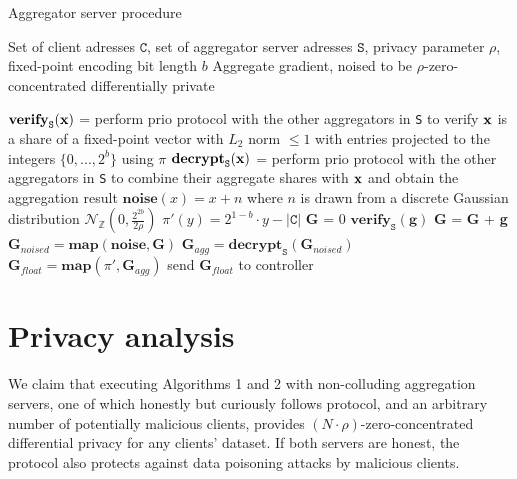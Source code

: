 \documentclass{article}
\begin{document}
\begin{algorithm}[h]
  \caption{Aggregator server procedure}\label{alg:server}
  \begin{algorithmic}[1]
  \Require Set of client adresses $\texttt{C}$, set of aggregator server adresses $\texttt{S}$, privacy parameter $\rho$, fixed-point encoding bit length $b$
  \Ensure Aggregate gradient, noised to be $\rho$-zero-concentrated differentially private

  \State$\textbf{verify}_{\texttt{S}}(\textbf x)$ = perform prio protocol with the other aggregators in \texttt{S} to verify $\textbf x$ is a share of a fixed-point vector with $L_2$ norm $\leq 1$ with entries projected to the integers $\{0,...,2^b\}$ using $\pi$
  \State$\textbf{decrypt}_{\texttt{S}}(\textbf x)$ = perform prio protocol with the other aggregators in \texttt{S} to combine their aggregate shares with $\textbf x$ and obtain the aggregation result
  \State$\textbf{noise}(x) = x+n$ where $n$ is drawn from a discrete Gaussian distribution $\mathcal N_\mathbb{Z}\left(0,\frac{2^{2b}}{2\rho}\right)$
  \State$\pi'(y) = 2^{1-b} \cdot y - |\texttt{C}|$ 
  \State\textbf{G} = 0
	   \State$\textbf{verify}_\texttt{S}(\textbf{g})$ \label{lst:line:verify}
	   \State\textbf{G} = \textbf{G} + \textbf{g}
  \EndFor
  \State$\textbf{G}_{noised} = \textbf{map}(\textbf{noise}, \textbf{G})$   \label{lst:line:noise}
  \State$\textbf{G}_{agg} = \textbf{decrypt}_{\texttt{S}}(\textbf{G}_{noised})$ 
  \State$\textbf{G}_{float} = \textbf{map}(\pi', \textbf{G}_{agg})$ 
  \State send $\textbf{G}_{float}$ to controller
  \end{algorithmic}
\end{algorithm}

\section{Privacy analysis}
We claim that executing Algorithms 1 and 2 with non-colluding aggregation servers, one of which honestly but curiously follows protocol, and an arbitrary number of potentially malicious clients, provides $(N \cdot \rho)$-zero-concentrated differential privacy for any clients' dataset. If both servers are honest, the protocol also protects against data poisoning attacks by malicious clients.
\end{document}
